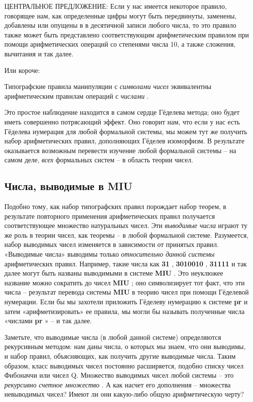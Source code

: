 \documentclass[../main.tex]{subfiles}
\begin{document}
ЦЕНТРАЛЬНОЕ ПРЕДЛОЖЕНИЕ: Если у нас имеется некоторое правило, говорящее нам, как определенные цифры могут быть передвинуты, заменены, добавлены или опущены в в десятичной записи любого числа, то это правило также может быть представлено соответствующим арифметическим правилом при помощи арифметических операций со степенями числа 10, а также сложения, вычитания и так далее.

Или короче:

Типографские правила манипуляции с \emph{символами чисел} эквивалентны арифметическим правилам операций с \emph{числами} .

Это простое наблюдение находится в самом сердце Гёделева метода; оно будет иметь совершенно потрясающий эффект. Оно говорит нам, что если у нас есть Гёделева нумерация для любой формальной системы, мы можем тут же получить набор арифметических правил, дополняющих Гёделев изоморфизм. В результате оказывается возможным перевести изучение любой формальной системы \--- на самом деле, \emph{всех} формальных систем \--- в область теории чисел.


\subsection{Числа, выводимые в MIU}

Подобно тому, как набор типографских правил порождает набор теорем, в результате повторного применения арифметических правил получается соответствующее множество натуральных чисел. Эти \emph{выводимые числа} играют ту же роль в теории чисел, как теоремы \--- в любой формальной системе. Разумеется, набор выводимых чисел изменяется в зависимости от принятых правил. «Выводимые числа» выводимы только \emph{относительно данной системы} арифметических правил. Например, такие числа как \textbf{31} , \textbf{3010010} , \textbf{31111} и так далее могут быть названы выводимыми в системе \textbf{MIU} . Это неуклюжее название можно сократить до чисел \textbf{MIU} ; оно символизирует тот факт, что эти числа \--- результат перевода системы \textbf{MIU} в теорию чисел при помощи Гёделевой нумерации. Если бы мы захотели приложить Гёделеву нумерацию к системе \textbf{pr} и затем «арифметизировать» ее правила, мы могли бы называть полученные числа «числами \textbf{pr} » \--- и так далее.

Заметьте, что выводимые числа (в любой данной системе) определяются рекурсивным методом: нам даны числа, о которых мы знаем, что они выводимы, и набор правил, объясняющих, как получить другие выводимые числа. Таким образом, класс выводимых чисел постоянно расширяется, подобно списку чисел Фибоначчи или чисел Q\@. Множество выводимых чисел любой системы \--- это \emph{рекурсивно счетное множество} . А как насчет его дополнения \--- множества невыводимых чисел? Имеют ли они какую-либо общую арифметическую черту?
\end{document}
